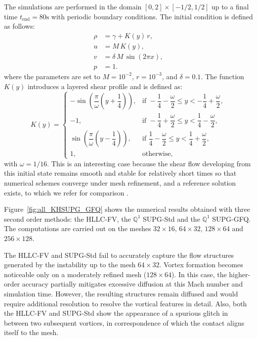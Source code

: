 \documentclass[a4paper,10pt]{article}
\begin{document}
The simulations are performed in the domain $[0,2]\times[-1/2,1/2]$ up to a final time $t_{\mathrm{end}} = 80\mathrm{s}$ with periodic boundary conditions. The initial condition is defined as follows:
\begin{equation}
	\begin{aligned}
		\rho &= \gamma + K(y)\,r, \\
		u &= M\,K(y), \\
		v &= \delta\,M\,\sin(2\pi x), \\
		p &= 1.
	\end{aligned}
\end{equation}
where the parameters are set to $M=10^{-2}$, $r=10^{-3}$, and $\delta=0.1$.  The function $K(y)$ introduces a layered shear profile and is defined as:
\begin{equation}
	K(y)=
	\begin{cases}
		-\sin\left(\dfrac{\pi}{\omega}\left(y+\dfrac{1}{4}\right)\right), 
		& \text{if } -\dfrac{1}{4}-\dfrac{\omega}{2}\le y< -\dfrac{1}{4}+\dfrac{\omega}{2}, \\[1.5ex]
		-1, 
		& \text{if } -\dfrac{1}{4}+\dfrac{\omega}{2}\le y< \dfrac{1}{4}-\dfrac{\omega}{2}, \\[1.5ex]
		\sin\left(\dfrac{\pi}{\omega}\left(y-\dfrac{1}{4}\right)\right), 
		& \text{if } \dfrac{1}{4}-\dfrac{\omega}{2}\le y< \dfrac{1}{4}+\dfrac{\omega}{2}, \\[1.5ex]
		1, 
		& \text{otherwise},
	\end{cases}
\end{equation}
with $\omega=1/16$.  This is an interesting case because the  shear flow developing from  this initial state remains smooth  and stable for
relatively short times so that numerical schemes converge under mesh refinement, and a reference solution exists, to which we refer for comparison \cite{leidi2024performance}.

Figure~\ref{fig:all_KHSUPG_GFQ} shows the numerical results obtained with three second order methods: the HLLC-FV, the $\mathbb{Q}^1$ SUPG-Std and the $\mathbb{Q}^1$ SUPG-GFQ. The computations are carried out on the meshes $32\times 16$, $64 \times 32$, $128 \times 64$ and $256 \times 128$.

The HLLC-FV and SUPG-Std fail to accurately capture the flow structures generated by the instability up to the mesh $64\times 32$. 
Vortex formation becomes noticeable only on a moderately refined mesh ($128\times 64$). In this case, the higher-order accuracy partially mitigates 
excessive diffusion at this Mach number and simulation time. 
However, the resulting structures remain diffused and would require additional resolution to resolve the vortical features in detail.
Also, both the HLLC-FV and SUPG-Std show  the appearance of a spurious glitch  in between two subsequent vortices, in correspondence of   which the contact aligns itself to the mesh.
\end{document}
